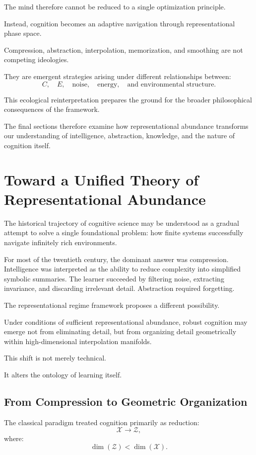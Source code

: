 \documentclass[12pt,a4paper]{article}
\begin{document}
The mind therefore cannot be reduced to a single optimization principle.

Instead, cognition becomes an adaptive navigation through representational phase space.

Compression, abstraction, interpolation, memorization, and smoothing are not competing ideologies.

They are emergent strategies arising under different relationships between:
\[
C,
\quad
E,
\quad
\text{noise},
\quad
\text{energy},
\quad
\text{and environmental structure}.
\]

This ecological reinterpretation prepares the ground for the broader philosophical consequences of the framework.

The final sections therefore examine how representational abundance transforms our understanding of intelligence, abstraction, knowledge, and the nature of cognition itself.

\section{Toward a Unified Theory of Representational Abundance}

The historical trajectory of cognitive science may be understood as a gradual attempt to solve a single foundational problem:
how finite systems successfully navigate infinitely rich environments.

For most of the twentieth century, the dominant answer was compression. Intelligence was interpreted as the ability to reduce complexity into simplified symbolic summaries. The learner succeeded by filtering noise, extracting invariance, and discarding irrelevant detail. Abstraction required forgetting.

The representational regime framework proposes a different possibility.

Under conditions of sufficient representational abundance, robust cognition may emerge not from eliminating detail, but from organizing detail geometrically within high-dimensional interpolation manifolds.

This shift is not merely technical.

It alters the ontology of learning itself.

\subsection{From Compression to Geometric Organization}

The classical paradigm treated cognition primarily as reduction:
\[
\mathcal{X}
\rightarrow
\mathcal{Z},
\]
where:
\[
\dim(\mathcal{Z})
<
\dim(\mathcal{X}).
\]
\end{document}
